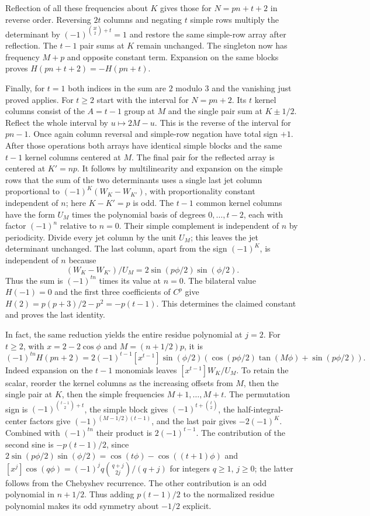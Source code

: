 \documentclass[11pt,a4paper]{article}
\begin{document}
Reflection of all these frequencies about $K$ gives those for $N=pn+t+2$ in reverse order. Reversing $2t$ columns and negating $t$ simple rows multiply the determinant by $(-1)^{\binom{2t}{2}+t}=1$ and restore the same simple-row array after reflection. The $t-1$ pair sums at $K$ remain unchanged. The singleton now has frequency $M+p$ and opposite constant term. Expansion on the same blocks proves $H(pn+t+2)=-H(pn+t)$.

Finally, for $t=1$ both indices in the sum are $2$ modulo $3$ and the vanishing just proved applies. For $t\ge2$ start with the interval for $N=pn+2$. Its $t$ kernel columns consist of the $A=t-1$ group at $M$ and the single pair sum at $K\pm1/2$. Reflect the whole interval by $u\mapsto 2M-u$. This is the reverse of the interval for $pn-1$. Once again column reversal and simple-row negation have total sign $+1$. After those operations both arrays have identical simple blocks and the same $t-1$ kernel columns centered at $M$. The final pair for the reflected array is centered at $K'=np$.
It follows by multilinearity and expansion on the simple rows that the sum of the two determinants uses a single last jet column proportional to $(-1)^K(W_K-W_{K'})$, with proportionality constant independent of $n$; here $K-K'=p$ is odd. The $t-1$ common kernel columns have the form $U_M$ times the polynomial basis of degrees $0,\ldots,t-2$, each with factor $(-1)^n$ relative to $n=0$. Their simple complement is independent of $n$ by periodicity. Divide every jet column by the unit $U_M$; this leaves the jet determinant unchanged. The last column, apart from the sign $(-1)^K$, is independent of $n$ because
\[
 (W_K-W_{K'})/U_M
 =2\sin(p\phi/2)\sin(\phi/2).
\]
Thus the sum is $(-1)^{tn}$ times its value at $n=0$. The bilateral value $H(-1)=0$ and the first three coefficients of $C^p$ give
$H(2)=p(p+3)/2-p^2=-p(t-1)$. This determines the claimed constant and proves the last identity.

In fact, the same reduction yields the entire residue polynomial at $j=2$. For $t\ge2$, with $x=2-2\cos\phi$ and $M=(n+1/2)p$, it is
\[
 (-1)^{tn}H(pn+2)
 =2(-1)^{t-1}[x^{t-1}]\sin(\phi/2)
 \left(\cos(p\phi/2)\tan(M\phi)+\sin(p\phi/2)\right).
\]
Indeed expansion on the $t-1$ monomials leaves $[x^{t-1}]W_K/U_M$. To retain the scalar, reorder the kernel columns as the increasing offsets from $M$, then the single pair at $K$, then the simple frequencies $M+1,\ldots,M+t$. The permutation sign is $(-1)^{\binom{t-1}{2}+t}$, the simple block gives $(-1)^{t+\binom t2}$, the half-integral-center factors give $(-1)^{(M-1/2)(t-1)}$, and the last pair gives $-2(-1)^K$. Combined with $(-1)^{tn}$ their product is $2(-1)^{t-1}$. The contribution of the second sine is $-p(t-1)/2$, since $2\sin(p\phi/2)\sin(\phi/2)=\cos(t\phi)-\cos((t+1)\phi)$ and $[x^j]\cos(q\phi)=(-1)^j q\binom{q+j}{2j}/(q+j)$ for integers $q\ge1$, $j\ge0$; the latter follows from the Chebyshev recurrence. The other contribution is an odd polynomial in $n+1/2$. Thus adding $p(t-1)/2$ to the normalized residue polynomial makes its odd symmetry about $-1/2$ explicit.
\end{document}
